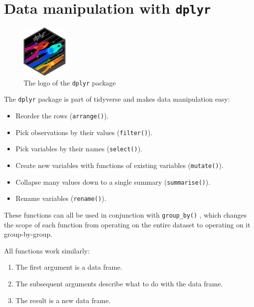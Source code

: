 \documentclass[
  12pt,
  oneside]{book}
\providecommand{\tightlist}{%
  \setlength{\itemsep}{0pt}\setlength{\parskip}{0pt}}
\begin{document}
\hypertarget{ch:dplyr}{%
\section{\texorpdfstring{Data manipulation with \texttt{dplyr}}{Data manipulation with dplyr}}\label{ch:dplyr}}

\begin{figure}
\centering
\includegraphics[width=0.2\textwidth,height=\textheight]{fig/dplyr-logo.png}
\caption{\label{fig:dplyr-logo} The logo of the \texttt{dplyr} package}
\end{figure}

The \texttt{dplyr} package is part of tidyverse and makes data manipulation easy:

\begin{itemize}
\tightlist
\item
  Reorder the rows (\texttt{arrange()}).
\item
  Pick observations by their values (\texttt{filter()}).
\item
  Pick variables by their names (\texttt{select()}).
\item
  Create new variables with functions of existing variables
  (\texttt{mutate()}).
\item
  Collapse many values down to a single summary (\texttt{summarise()}).
\item
  Rename variables (\texttt{rename()}).
\end{itemize}

These functions can all be used in conjunction with \texttt{group\_by()} , which changes the scope of each function from operating on the entire dataset to operating on it group-by-group.

All functions work similarly:

\begin{enumerate}
\def\labelenumi{\arabic{enumi}.}
\tightlist
\item
  The first argument is a data frame.
\item
  The subsequent arguments describe what to do with the data frame.
\item
  The result is a new data frame.
\end{enumerate}
\end{document}

